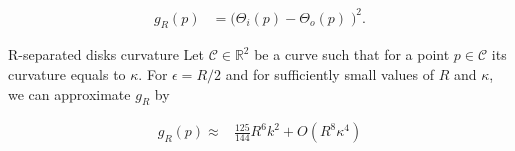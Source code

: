 \begin{align*}
	g_{R}(p) &= \Big( \Theta_i(p) - \Theta_o(p) \;\Big)^2.
\end{align*}

\begin{claim}{R-separated disks curvature}\label{claim:r-separated-disks}
 Let $\mathcal{C} \in \mathbb{R}^2$ be a curve such that for a point $p \in \mathcal{C}$ its curvature equals to $\kappa$. For $\epsilon=R/2$ and for sufficiently small values of $R$ and $\kappa$, we can approximate $g_R$ by



\begin{align*}
g_R(p) \approx & \frac{125}{144}R^6k^2 + O(R^{8}\kappa^4)
\end{align*} 

\end{claim}


